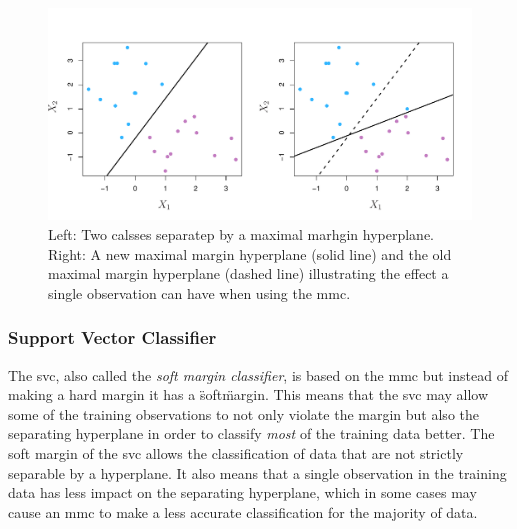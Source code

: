 \documentclass[11pt]{article}
\begin{document}
\begin{figure}[ht]
  \centering
  \includegraphics[width=12cm]{graphics/9_5.pdf}
  \caption{Left: Two calsses separatep by a maximal marhgin hyperplane. Right: A new maximal margin hyperplane (solid line) and the old maximal margin hyperplane (dashed line) illustrating the effect a single observation can have when using the \gls{mmc}.}
\end{figure}

\subsubsection{Support Vector Classifier}
The \gls{svc}, also called the \textit{soft margin classifier}, is based on the \gls{mmc} but instead of making a hard margin it has a \"soft\" margin. This means that the \gls{svc} may allow some of the training observations to not only violate the margin but also the separating hyperplane in order to classify \textit{most} of the training data better. The soft margin of the \gls{svc} allows the classification of data that are not strictly separable by a hyperplane. It also means that a single observation in the training data has less impact on the separating hyperplane, which in some cases may cause an \gls{mmc} to make a less accurate classification for the majority of data.\cite{jamesSupportVectorMachines}
\end{document}
